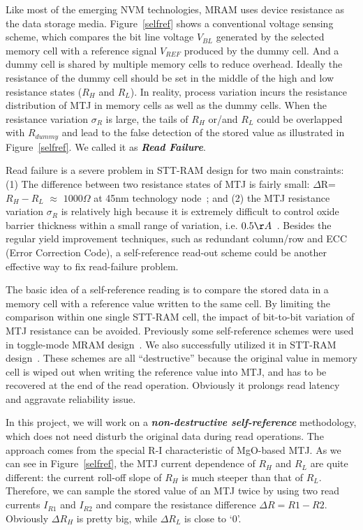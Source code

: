 Like most of the emerging NVM technologies, MRAM uses device resistance as the data storage media. Figure~\ref{selfref} shows a conventional voltage sensing scheme, which compares the bit line voltage $V_{BL}$ generated by the selected memory cell with a reference signal $V_{REF}$ produced by the dummy cell. And a dummy cell is shared by multiple memory cells to reduce overhead. Ideally the resistance of the dummy cell should be set in the middle of the high and low resistance states ($R_H$ and $R_L$). In reality, process variation incurs the resistance distribution of MTJ in memory cells as well as the dummy cells. When the resistance variation $\sigma_R$ is large, the tails of $R_H$ or/and $R_L$ could be overlapped with $R_{dummy}$ and lead to the false detection of the stored value as illustrated in Figure~\ref{selfref}. We called it as \textbf{\emph{Read Failure}}.

Read failure is a severe problem in STT-RAM design for two main constraints: (1) The difference between two resistance states of MTJ is fairly small: $\Delta$R=$R_H-R_L$ $\approx$ $1000\Omega$ at 45nm technology node~\cite{Li09}; and (2) the MTJ resistance variation $\sigma_R$ is relatively high because it is extremely difficult to control oxide barrier thickness within a small range of variation, i.e. $0.5{\AA}$~\cite{Jeong03}. Besides the regular yield improvement techniques, such as redundant column/row and ECC (Error Correction Code), a self-reference read-out scheme could be another effective way to fix read-failure problem.

The basic idea of a self-reference reading is to compare the stored data in a memory cell with a reference value written to the same cell. By limiting the comparison within one single STT-RAM cell, the impact of bit-to-bit variation of MTJ resistance can be avoided. Previously some self-reference schemes were used in toggle-mode MRAM design~\cite{MRAM:TTO+06,Jeong03}. We also successfully utilized it in STT-RAM design~\cite{Li:147723}. These schemes are all ``destructive'' because the original value in memory cell is wiped out when writing the reference value into MTJ, and has to be recovered at the end of the read operation. Obviously it prolongs read latency and aggravate reliability issue.

In this project, we will work on a \textbf{\textit{non-destructive self-reference}} methodology, which does not need disturb the original data during read operations. The approach comes from the special R-I characteristic of MgO-based MTJ. As we can see in Figure~\ref{selfref}, the MTJ current dependence of $R_H$ and $R_L$ are quite different: the current roll-off slope of $R_H$ is much steeper than that of $R_L$. Therefore, we can sample the stored value of an MTJ twice by using two read currents $I_{R1}$ and $I_{R2}$ and compare the resistance difference ${\Delta}R=R1-R2$. Obviously ${\Delta}R_H$ is pretty big, while ${\Delta}R_L$ is close to `0'.

